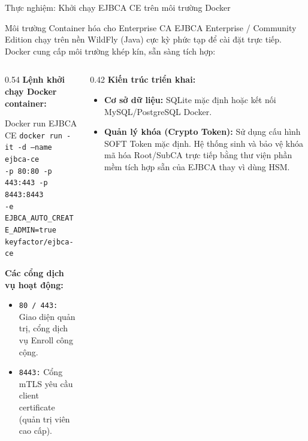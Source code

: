 \documentclass[10pt, aspectratio=169]{beamer}
\begin{document}
\begin{frame}{Thực nghiệm: Khởi chạy EJBCA CE trên môi trường Docker}
    \begin{block}{Môi trường Container hóa cho Enterprise CA}
        EJBCA Enterprise / Community Edition chạy trên nền WildFly (Java) cực kỳ phức tạp để cài đặt trực tiếp. Docker cung cấp môi trường khép kín, sẵn sàng tích hợp:
    \end{block}
    \begin{columns}[onlytextwidth]
        \begin{column}{0.54\textwidth}
            \textbf{Lệnh khởi chạy Docker container:}
            \begin{exampleblock}{Docker run EJBCA CE}
                \texttt{docker run -it -d --name ejbca-ce \\}
                \texttt{\quad -p 80:80 -p 443:443 -p 8443:8443 \\}
                \texttt{\quad -e EJBCA\_AUTO\_CREATE\_ADMIN=true \\}
                \texttt{\quad keyfactor/ejbca-ce}
            \end{exampleblock}
            \vspace{0.1cm}
            \textbf{Các cổng dịch vụ hoạt động:}
            \begin{itemize}
                \item \texttt{80 / 443:} Giao diện quản trị, cổng dịch vụ Enroll công cộng.
                \item \texttt{8443:} Cổng mTLS yêu cầu client certificate (quản trị viên cao cấp).
            \end{itemize}
        \end{column}
        \begin{column}{0.42\textwidth}
            \textbf{Kiến trúc triển khai:}
            \begin{itemize}
                \item \textbf{Cơ sở dữ liệu:} SQLite mặc định hoặc kết nối MySQL/PostgreSQL Docker.
                \item \textbf{Quản lý khóa (Crypto Token):} Sử dụng cấu hình SOFT Token mặc định. Hệ thống sinh và bảo vệ khóa mã hóa Root/SubCA trực tiếp bằng thư viện phần mềm tích hợp sẵn của EJBCA thay vì dùng HSM.
            \end{itemize}
        \end{column}
    \end{columns}
\end{frame}
\end{document}
